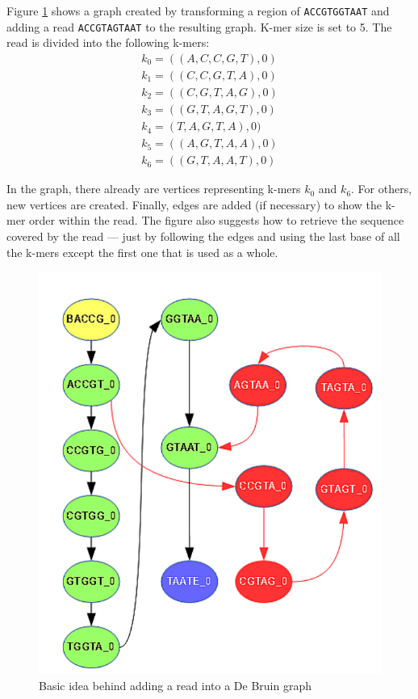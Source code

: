 Figure \ref{fig:read-idea} shows a graph created by transforming a region of \texttt{ACCGTGGTAAT} and adding a read \texttt{ACCGTAGTAAT} to the resulting graph. K-mer size is set to 5. The read is divided into the following k-mers:
\begin{gather}
k_0 = ((A, C, C, G, T), 0) \\
k_1 = ((C, C, G, T, A), 0) \\
k_2 = ((C, G, T, A, G), 0) \\
k_3 = ((G, T, A, G, T), 0) \\
k_4 = (T, A, G, T, A), 0) \\
k_5 = ((A, G, T, A, A), 0) \\
k_6 = ((G, T, A, A, T), 0)
\end{gather}

In the graph, there already are vertices representing k-mers $k_0$ and $k_6$. For others, new vertices are created. Finally, edges are added (if necessary) to show the k-mer order within the read. The figure also suggests how to retrieve the sequence covered by the read --- just by following the edges and using the last base of all the k-mers except the first one that is used as a whole. 

\begin{figure}[h]
	\centering
	\includegraphics{img/read-idea.pdf}
	\caption{Basic idea behind adding a read into a De Bruin graph}
	\label{fig:read-idea}
\end{figure}

